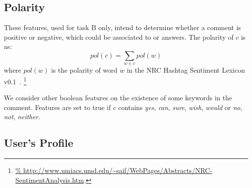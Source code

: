
\subsection{Polarity}
\label{sub:polarity}

These features, used for task B only, intend to determine whether a comment is 
positive or negative, which could be associated to \yes or \no answers. The
polarity of $c$ is  as:
\begin{equation}
pol(c) = \sum_{w\in c} pol(w) 
\end{equation}
%
where $pol(w)$ is the polarity of word $w$ in the NRC Hashtag Sentiment 
Lexicon v0.1~\cite{MohammadKZ2013}.%
\footnote{\url{%
http://www.umiacs.umd.edu/~saif/WebPages/Abstracts/NRC-SentimentAnalysis.htm}.}

We consider other boolean features on the existence of some keywords in the 
comment. Features are set to true if $c$ contains
\Ni \textit{yes}, \textit{can}, \textit{sure}, \textit{wish}, \textit{would} or
\Nii \textit{no}, \textit{not}, \textit{neither}.


\subsection{User's Profile}
\label{sub:profile}

